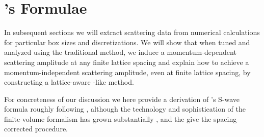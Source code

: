 \section{\Luscher's Formulae}\label{sec:luescher}

In subsequent sections we will extract scattering data from numerical calculations for particular box sizes and discretizations.
We will show that when tuned and analyzed using the traditional \Luscher method, we induce a momentum-dependent scattering amplitude at any finite lattice spacing and explain how to achieve a momentum-independent scattering amplitude, even at finite lattice spacing, by constructing a lattice-aware \Luscher-like method.

For concreteness of our discussion we here provide a derivation of \Luscher's S-wave formula roughly following , although the technology and sophistication of the finite-volume formalism has grown substantially \cite{Ozaki:2012ce,Hansen:2012tf,Briceno:2013hya,Briceno:2013lba,Li:2014wga,Zhu:2019dho}, and the give the spacing-corrected procedure.



